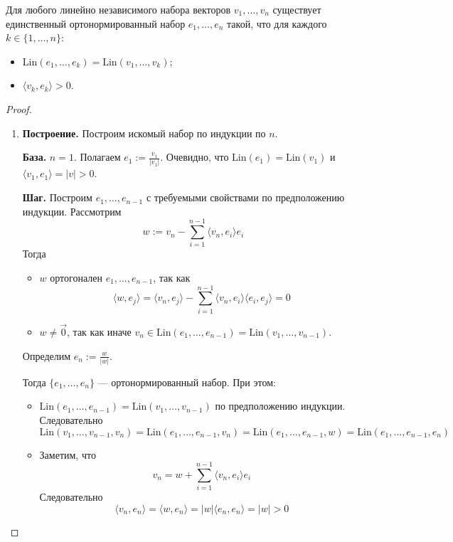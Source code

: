 \documentclass[12pt,a4paper]{article}
\newcommand{\Lin}{\ensuremath{\mathrm{Lin}}\xspace}
\begin{document}
    \begin{theorem}
        Для любого линейно независимого набора векторов $v_1, \dots, v_n$ существует единственный ортонормированный набор $e_1, \dots, e_n$ такой, что для каждого $k \in \{1, \dots, n\}$:
        \begin{itemize}
            \item $\Lin(e_1, \dots, e_k) = \Lin(v_1, \dots, v_k)$;
            \item $\langle v_k, e_k \rangle > 0$.
        \end{itemize}
    \end{theorem}

    \begin{proof}
        \begin{enumerate}
            \item \textbf{Построение.} Построим искомый набор по индукции по $n$.

                \textbf{База.} $n = 1$. Полагаем $e_1 := \frac{v_1}{|v_1|}$. Очевидно, что $\Lin(e_1) = \Lin(v_1)$ и $\langle v_1, e_1 \rangle = |v| > 0$.

                \textbf{Шаг.} Построим $e_1, \dots, e_{n-1}$ с требуемыми свойствами по предположению индукции. Рассмотрим
                \[w := v_n - \sum_{i=1}^{n-1} \langle v_n, e_i \rangle e_i\]
                Тогда
                \begin{itemize}
                    \item $w$ ортогонален $e_1, \dots, e_{n-1}$, так как
                        \[\langle w, e_j \rangle = \langle v_n, e_j \rangle - \sum_{i=1}^{n-1} \langle v_n, e_i \rangle \langle e_i, e_j \rangle = 0\]
                    \item $w \neq \vec{0}$, так как иначе $v_n \in \Lin(e_1, \dots, e_{n-1}) = \Lin(v_1, \dots, v_{n-1})$.
                \end{itemize}
                Определим $e_n := \frac{w}{|w|}$.
                
                Тогда $\{e_1, \dots, e_n\}$ --- ортонормированный набор. При этом:
                \begin{itemize}
                    \item $\Lin(e_1, \dots, e_{n-1}) = \Lin(v_1, \dots, v_{n-1})$ по предположению индукции. Следовательно
                        \[\Lin(v_1, \dots, v_{n-1}, v_n) = \Lin(e_1, \dots, e_{n-1}, v_n) = \Lin(e_1, \dots, e_{n-1}, w) = \Lin(e_1, \dots, e_{n-1}, e_n)\]
                    \item Заметим, что
                        \[v_n = w + \sum_{i=1}^{n-1} \langle v_n, e_i \rangle e_i\]
                        Следовательно
                        \[\langle v_n, e_n \rangle = \langle w, e_n \rangle = |w| \langle e_n, e_n \rangle = |w| > 0\]
                \end{itemize}
            

\end{enumerate}
\end{proof}
\end{document}
